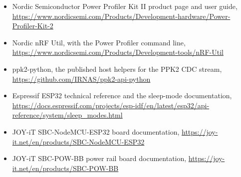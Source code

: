 \begin{itemize}
\item Nordic Semiconductor Power Profiler Kit II product page and user guide,
\url{https://www.nordicsemi.com/Products/Development-hardware/Power-Profiler-Kit-2}
\item Nordic nRF Util, with the Power Profiler command line,
\url{https://www.nordicsemi.com/Products/Development-tools/nRF-Util}
\item ppk2-python, the published host helpers for the PPK2 CDC stream,
\url{https://github.com/IRNAS/ppk2-api-python}
\item Espressif ESP32 technical reference and the sleep-mode documentation,
\url{https://docs.espressif.com/projects/esp-idf/en/latest/esp32/api-reference/system/sleep_modes.html}
\item JOY-iT SBC-NodeMCU-ESP32 board documentation,
\url{https://joy-it.net/en/products/SBC-NodeMCU-ESP32}
\item JOY-iT SBC-POW-BB power rail board documentation,
\url{https://joy-it.net/en/products/SBC-POW-BB}
\end{itemize}
